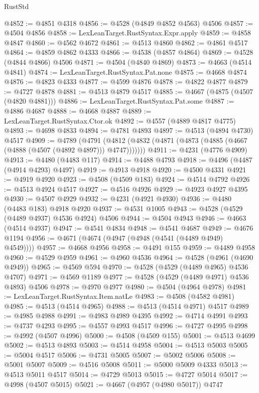 \begin{lexlean}{RustStd}
\begin{coremodule}
@4852 := @4851 @4318
@4856 := @4528 (@4849 @4852 @4563) @4506
@4857 := @4504 @4856
@4858 := LexLeanTarget.RustSyntax.Expr.apply
@4859 := @4858 @4847
@4860 := @4562 @4672
@4861 := @4513 @4860
@4862 := @4861 @4517
@4864 := @4859 @4862 @4333
@4866 := @4538 (@4857 @4864)
@4869 := @4528 (@4844 @4866) @4506
@4871 := @4504 (@4840 @4869)
@4873 := @4663 (@4514 @4841)
@4874 := LexLeanTarget.RustSyntax.Pat.none
@4875 := @4668 @4874
@4876 := @4823 @4333
@4877 := @4599 @4876
@4878 := @4822 @4877
@4879 := @4727 @4878
@4881 := @4513 @4879 @4517
@4885 := @4667 (@4875 (@4507 (@4820 @4881)))
@4886 := LexLeanTarget.RustSyntax.Pat.some
@4887 := @4886 @4687
@4888 := @4668 @4887
@4889 := LexLeanTarget.RustSyntax.Ctor.ok
@4892 := @4557 (@4889 @4817 @4775)
@4893 := @4698 @4833
@4894 := @4781 @4893
@4897 := @4513 (@4894 @4730) @4517
@4909 := @4789
    (@4791 (@4812 (@4832 (@4871 (@4873 (@4885 (@4667 (@4888 (@4507 (@4892 @4897))) @4747)))))))
@4911 := @4231 (@4776 @4909)
@4913 := @4480 (@4483 @117)
@4914 := @4488 @4793
@4918 := @4496 (@4487 (@4914 @4293) @4497)
@4919 := @4913 @4918
@4920 := @4500 @4331
@4921 := @4919 @4920
@4923 := @4508 (@4509 @183)
@4924 := @4514 @4792
@4926 := @4513 @4924 @4517
@4927 := @4516 @4926
@4929 := @4923 @4927 @4395
@4930 := @4507 @4929
@4932 := @4231 (@4921 @4930)
@4936 := @4480 (@4483 @183) @4918 @4920
@4937 := @4531 @1005
@4943 := @4528 (@4529 (@4489 @4937) @4536 @4924) @4506
@4944 := @4504 @4943
@4946 := @4663 (@4514 @4937)
@4947 := @4541 @4834
@4948 := @4541 @4687
@4949 := @4676 @1194
@4956 := @4671 (@4674 (@4947 (@4948 (@4541 (@4489 @4949) @4549))))
@4957 := @4668 @4956
@4958 := @4491 @155
@4959 := @4489 @4958
@4960 := @4529 @4959
@4961 := @4960 @4536
@4964 := @4528 (@4961 (@4690 @4949))
@4965 := @4569 @594
@4970 := @4528 (@4529 (@4489 @4965) @4536 @4707)
@4971 := @4569 @1189
@4977 := @4528 (@4529 (@4489 @4971) @4536 @4893) @4506
@4978 := @4970 @4977
@4980 := @4504 (@4964 @4978)
@4981 := LexLeanTarget.RustSyntax.Item.natLe
@4983 := @4508 (@4582 @4981)
@4985 := @4513 (@4514 @4965)
@4988 := @4513 (@4514 @4971) @4517
@4989 := @4985 @4988
@4991 := @4983 @4989 @4395
@4992 := @4714 @4991
@4993 := @4737 @4293
@4995 := @4557 @4993 @4517
@4996 := @4727 @4995
@4998 := @4992 (@4507 @4996)
@5000 := @4508 (@4509 @155)
@5001 := @4513 @4699
@5002 := @4513 @4893
@5003 := @4514 @4958
@5004 := @4513 @5003
@5005 := @5004 @4517
@5006 := @4731 @5005
@5007 := @5002 @5006
@5008 := @5001 @5007
@5009 := @4516 @5008
@5011 := @5000 @5009 @4333
@5013 := @4513 @5011 @4517
@5014 := @4729 @5013
@5015 := @4727 @5014
@5017 := @4998 (@4507 @5015)
@5021 := @4667 (@4957 (@4980 @5017)) @4747

\end{coremodule}
\end{lexlean}

